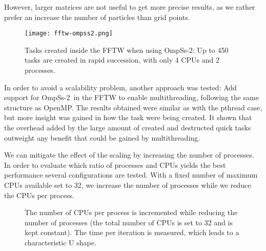 %
However, larger matrices are not useful to get more precise results, as we 
rather prefer an increase the number of particles than grid points.


\begin{figure}[h]%
	\centering
	\texttt{[image: fftw-ompss2.png]}
	\caption{Tasks created inside the FFTW when using OmpSs-2: Up to 450 tasks are 
	created in rapid succession, with only 4 CPUs and 2 processes.}
	\label{fig:fftw-ompss2}
\end{figure}%

In order to avoid a scalability problem, another approach was tested: Add 
support for OmpSs-2~in the FFTW to enable multithreading, following the same 
structure as OpenMP. The results obtained were similar as with the pthread case, 
but more insight was gained in how the task were being created. It shown that 
the overhead added by the large amount of created and destructed quick tasks 
outweight any benefit that could be gained by multithreading.

We can mitigate the effect of the scaling by increasing the number of processes.  
In order to evaluate which ratio of processes and CPUs yields the best 
performance several configurations are tested. With a fixed number of maximum 
CPUs available set to 32, we increase the number of processes while we reduce 
the CPUs per process.

\begin{figure}[h]%
	\centering
	\caption{The number of CPUs per process is incremented while reducing the 
	number of processes (the total number of CPUs is set to 32 and is kept 
	constant).  The time per iteration is measured, which leads to a 
	characteristic U shape.}
	\label{fig:fftw-u}
\end{figure}%

